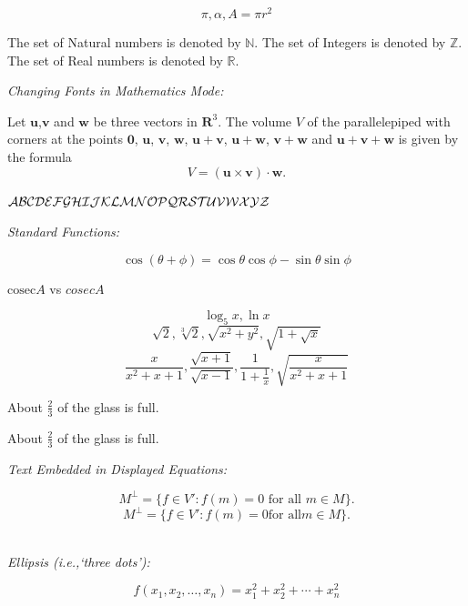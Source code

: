 \documentclass[12pt]{article}
\begin{document}
\[ \pi, \alpha, A = \pi r^2 \]

The set of Natural numbers is denoted by $\mathbb{N}$. The set of Integers is denoted by $\mathbb{Z}$. The set of Real numbers is denoted by $\mathbb{R}$. \\

\noindent
\begin{large}\textit{Changing Fonts in Mathematics Mode:}\end{large}

Let $\mathbf{u}$,$\mathbf{v}$ and $\mathbf{w}$ be three vectors in ${\mathbf R}^3$. The volume $V$ of the parallelepiped with corners at the points $\mathbf{0}$, $\mathbf{u}$, $\mathbf{v}$, $\mathbf{w}$, $\mathbf{u}+\mathbf{v}$, $\mathbf{u}+\mathbf{w}$, $\mathbf{v}+\mathbf{w}$ and $\mathbf{u}+\mathbf{v}+\mathbf{w}$ is given by the formula
\[ V = (\mathbf{u} \times \mathbf{v}) \cdot \mathbf{w}.\]

$\cal{ABCDEFGHIJKLMNOPQRSTUVWXYZ}$ \\

\noindent
\begin{large}\textit{Standard Functions:}\end{large}

\[ \cos(\theta + \phi) = \cos \theta \cos \phi - \sin \theta \sin \phi \]

$\mathrm{cosec} A$ vs $cosec A$

\[ \log_5 x, \ln x \]
\[ \sqrt{2}, \sqrt[3]{2}, \sqrt{x^2+y^2}, \sqrt{1+\sqrt{x}} \]
\[ \frac{x}{x^2+x+1}, \frac{\sqrt{x+1}}{\sqrt{x-1}},
   \frac{1}{1+\frac{1}{x}}, \sqrt{\frac{x}{x^2+x+1}} \]

About ${\frac{2}{3}}$ of the glass is full.

About $\displaystyle{\frac{2}{3}}$ of the glass is full. \\

\noindent
\begin{large}\textit{Text Embedded in Displayed Equations:}\end{large}

\[ M^\bot = \{ f \in V' : f(m) = 0 \mbox{ for all } m \in M \}.\]
\[ M^\bot = \{ f \in V' : f(m) = 0 \mbox{for all} m \in M \}.\] \\

\noindent
\begin{large}\textit{Ellipsis (i.e.,`three dots'):}\end{large}

\[ f(x_1, x_2, \ldots, x_n) = x_1^2 + x_2^2 + \cdots + x_n^2 \]
\end{document}
